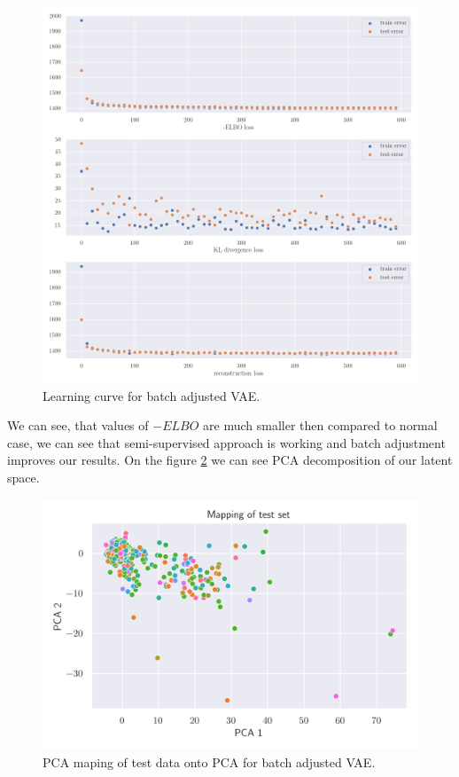 \documentclass[12pt,a4paper]{article}
\begin{document}
\begin{figure}[H]
    \begin{center}
    \includegraphics[scale=0.4]{src/batch_VAE_training_100.png}
    \end{center}
    \caption{Learning curve for batch adjusted VAE.}
    \label{fig:batch_train}
\end{figure}
We can see, that values of $-ELBO$ are much smaller then compared to normal case, we can see that semi-supervised approach is working and batch adjustment 
improves our results. On the figure \ref{fig:pca_batch} we can see PCA decomposition of our latent space.
\begin{figure}[H]
    \begin{center}
    \includegraphics[scale=1]{src/negbinom_batch_pca_100.png}
    \end{center}
    \caption{PCA maping of test data onto PCA for batch adjusted VAE.}
    \label{fig:pca_batch}
\end{figure}
\end{document}
